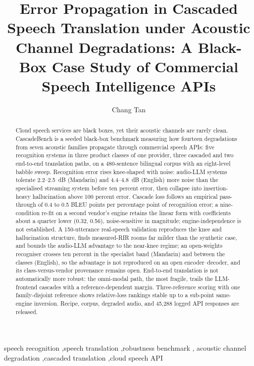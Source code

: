 \documentclass[review,authoryear,sort&compress]{elsarticle}
\begin{document}
\begin{frontmatter}

\title{Error Propagation in Cascaded Speech Translation under Acoustic Channel
Degradations: A Black-Box Case Study of Commercial Speech Intelligence APIs}

\author[addr1]{Chang Tan}
\address[addr1]{Dalian University of Technology, Dalian, China}

\begin{abstract}
Cloud speech services are black boxes, yet their acoustic channels are
rarely clean. CascadeBench is a seeded black-box
benchmark measuring how fourteen degradations from seven acoustic
families propagate through commercial speech APIs: five recognition systems
in three product classes of one provider, three cascaded and two end-to-end
translation paths, on a 480-sentence bilingual corpus with an eight-level
babble sweep. Recognition error rises
knee-shaped with noise: audio-LLM systems tolerate
2.2--2.5~dB (Mandarin) and 4.4--4.8~dB (English) more noise than the
specialised streaming system before ten percent error, then
collapse into insertion-heavy hallucination above 100
percent error. Cascade loss follows an empirical pass-through of
0.4 to 0.5 BLEU points per percentage point of recognition error; a
nine-condition re-fit on a second vendor's engine retains the linear form
with coefficients about a quarter lower (0.32, 0.56),
noise-sensitive in magnitude; engine-independence is
not established. A 150-utterance real-speech validation
reproduces the knee and hallucination structure, finds
measured-RIR rooms far milder than the synthetic case, and
bounds the audio-LLM advantage to the near-knee regime; an open-weights
recogniser crosses ten percent in the specialist
band (Mandarin) and between the classes (English), so the advantage is not
reproduced on an open encoder--decoder, and its
class-versus-vendor provenance remains open. End-to-end
translation is not automatically more robust: the omni-modal path, the
most fragile, trails the LLM-frontend cascades with a
reference-dependent margin. Three-reference scoring with one family-disjoint
reference shows relative-loss rankings stable
up to a sub-point same-engine inversion. Recipe,
corpus, degraded audio, and 45{,}288 logged API responses are released.
\end{abstract}

\begin{keyword}
speech recognition \sep speech translation \sep robustness benchmark \sep
acoustic channel degradation \sep cascaded translation \sep cloud speech API
\end{keyword}

\end{frontmatter}
\end{document}

